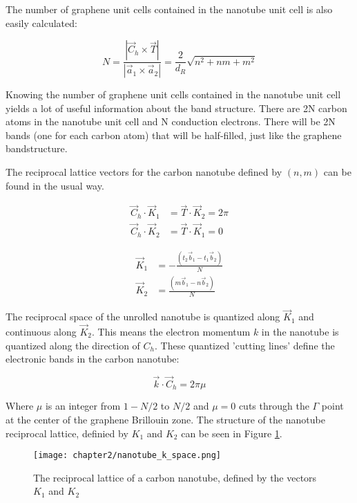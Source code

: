 The number of graphene unit cells contained in the nanotube unit cell is also easily calculated:

\begin{equation}
    N = \frac{\left| \vec{C}_h \times \vec{T} \right|}{\left| \vec{a}_1 \times \vec{a}_2 \right|} = \frac{2}{d_R}\sqrt{n^2+nm+m^2}
    \label{eq:cnt_N}
\end{equation}

Knowing the number of graphene unit cells contained in the nanotube unit cell yields a lot of useful information about the band structure. There are 2N carbon atoms in the nanotube unit cell and N conduction electrons. There will be 2N bands (one for each carbon atom) that will be half-filled, just like the graphene bandstructure.

The reciprocal lattice vectors for the carbon nanotube defined by $(n,m)$ can be found in the usual way.

\begin{align}
    \vec{C}_h\cdot\vec{K}_1 &= \vec{T}\cdot\vec{K}_2 = 2\pi \nonumber \\
    \vec{C}_h\cdot\vec{K}_2 &= \vec{T}\cdot\vec{K}_1 = 0 \label{eq:cnt_recip}
\end{align}
    
\begin{align}
    \vec{K}_1 &= -\frac{(t_2 \vec{b}_1 - t_1 \vec{b}_2)}{N} \nonumber \\
    \vec{K}_2 &= \frac{(m \vec{b}_1 - n \vec{b}_2)}{N} \label{eq:K1_K2}
\end{align}

The reciprocal space of the unrolled nanotube is quantized along $\vec{K}_1$ and continuous along $\vec{K}_2$. This means the electron momentum $k$ in the nanotube is quantized along the direction of $C_h$. These quantized 'cutting lines' define the electronic bands in the carbon nanotube:

\begin{equation}
    \vec{k}\cdot\vec{C}_h = 2\pi\mu
\end{equation}

Where $\mu$ is an integer from $1-N/2$ to $N/2$ and $\mu=0$ cuts through the $\Gamma$ point at the center of the graphene Brillouin zone. The structure of the nanotube reciprocal lattice, definied by $K_1$ and $K_2$ can be seen in Figure \ref{fig:cnt_k_space}. 

\begin{figure}
    \centering
    \texttt{[image: chapter2/nanotube\_k\_space.png]}
    \caption{The reciprocal lattice of a carbon nanotube, defined by the vectors $K_1$ and $K_2$}
    \label{fig:cnt_k_space}
\end{figure}

